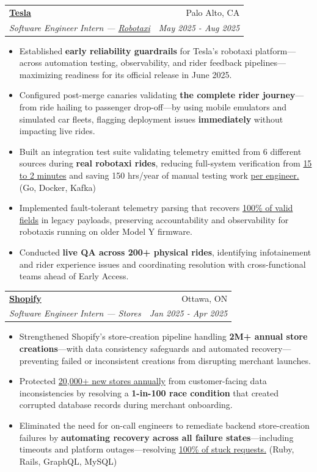 \documentclass[letterpaper,11pt]{article}
\makeatletter
\newcommand{\resumeItem}[1]{
  \item\small{
    {#1 \vspace{-2pt}}
  }
}
\newcommand{\resumeTopBulletItem}[1]{
  \item\small{
    \vspace{3pt}  %
    {#1 \vspace{-3pt}}
  }
}
\newcommand{\resumeSubheading}[4]{
  \vspace{-2pt}\item
    \begin{tabular*}{0.97\textwidth}[t]{l@{\extracolsep{\fill}}r}
      \textbf{#1} & #2 \\
      \textit{\small#3} & \textit{\small #4} \\
    \end{tabular*}\vspace{-8pt} %
}
\newcommand{\resumeItemListStart}{\begin{itemize}[leftmargin=0.3in]}
\newcommand{\resumeItemListEnd}{\end{itemize}\vspace{-5pt}}
\makeatother
\begin{document}
    \resumeSubheading
      {\href{https://tesla.com}{Tesla}}{Palo Alto, CA}
      {Software Engineer Intern — \href{https://www.tesla.com/robotaxi}{Robotaxi}}{May 2025 - Aug 2025}
      \resumeItemListStart
        \resumeTopBulletItem{Established \textbf{early reliability guardrails} for Tesla's robotaxi platform—across automation testing, observability, and rider feedback pipelines—maximizing readiness for its official release in June 2025.}
        \resumeItem{Configured post-merge canaries validating \textbf{the complete rider journey}—from ride hailing to passenger drop-off—by using mobile emulators and simulated car fleets, flagging deployment issues \textbf{immediately} without impacting live rides.}        \resumeItem{Built an integration test suite validating telemetry emitted from 6 different sources during \textbf{real robotaxi rides}, reducing full-system verification from \underline{15 to 2 minutes} and saving 150 hrs/year of manual testing work \underline{per engineer.} (Go, Docker, Kafka)}
        \resumeItem{Implemented fault-tolerant telemetry parsing that recovers \underline{100\% of valid fields} in legacy payloads, preserving accountability and observability for robotaxis running on older Model Y firmware.}
        \resumeItem{Conducted \textbf{live QA across 200+ physical rides}, identifying infotainement and rider experience issues and coordinating resolution with cross-functional teams ahead of Early Access.}
      \resumeItemListEnd

    
    \vspace{1mm}
  
    \resumeSubheading
      {\href{https://shopify.com}{Shopify}}{Ottawa, ON}
      {Software Engineer Intern — Stores}{Jan 2025 - Apr 2025}
      \resumeItemListStart
        \resumeTopBulletItem{Strengthened Shopify's store-creation pipeline handling \textbf{2M+ annual store creations}—with data consistency safeguards and automated recovery—preventing failed or inconsistent creations from disrupting merchant launches.}
      \resumeItem{Protected \underline{20,000+ new stores annually} from customer-facing data inconsistencies by resolving a \textbf{1-in-100 race condition} that created corrupted database records during merchant onboarding.}
        \resumeItem{Eliminated the need for on-call engineers to remediate backend store-creation failures by \textbf{automating recovery across all failure states}—including timeouts and platform outages—resolving \underline{100\% of stuck requests.} (Ruby, Rails, GraphQL, MySQL)}
    \resumeItemListEnd
\end{document}
